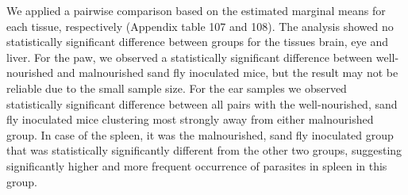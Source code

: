 \documentclass[
  12pt,
  letterpaper,
]{article}
\begin{document}
We applied a pairwise comparison based on the estimated marginal means for each tissue, respectively (Appendix table 107 and 108). The analysis showed no statistically significant difference between groups for the tissues brain, eye and liver. For the paw, we observed a statistically significant difference between well-nourished and malnourished sand fly inoculated mice, but the result may not be reliable due to the small sample size. For the ear samples we observed statistically significant difference between all pairs with the well-nourished, sand fly inoculated mice clustering most strongly away from either malnourished group. In case of the spleen, it was the malnourished, sand fly inoculated group that was statistically significantly different from the other two groups, suggesting significantly higher and more frequent occurrence of parasites in spleen in this group.
\end{document}
